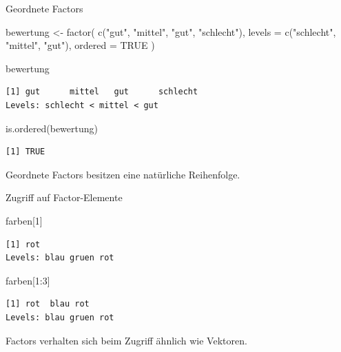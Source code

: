 \documentclass[
  10pt,
  ignorenonframetext,
  aspectratio=169,
]{beamer}
\newenvironment{Shaded}{}{}
\newcommand{\AttributeTok}[1]{\textcolor[rgb]{0.49,0.56,0.16}{#1}}
\newcommand{\ConstantTok}[1]{\textcolor[rgb]{0.53,0.00,0.00}{#1}}
\newcommand{\DecValTok}[1]{\textcolor[rgb]{0.25,0.63,0.44}{#1}}
\newcommand{\FunctionTok}[1]{\textcolor[rgb]{0.02,0.16,0.49}{#1}}
\newcommand{\NormalTok}[1]{#1}
\newcommand{\OtherTok}[1]{\textcolor[rgb]{0.00,0.44,0.13}{#1}}
\newcommand{\SpecialCharTok}[1]{\textcolor[rgb]{0.25,0.44,0.63}{#1}}
\newcommand{\StringTok}[1]{\textcolor[rgb]{0.25,0.44,0.63}{#1}}
\begin{document}
\begin{frame}[fragile]{Geordnete Factors}
\label{geordnete-factors}
\begin{Shaded}
\begin{Highlighting}[]
\NormalTok{bewertung }\OtherTok{\textless{}{-}} \FunctionTok{factor}\NormalTok{(}
  \FunctionTok{c}\NormalTok{(}\StringTok{"gut"}\NormalTok{, }\StringTok{"mittel"}\NormalTok{, }\StringTok{"gut"}\NormalTok{, }\StringTok{"schlecht"}\NormalTok{),}
  \AttributeTok{levels =} \FunctionTok{c}\NormalTok{(}\StringTok{"schlecht"}\NormalTok{, }\StringTok{"mittel"}\NormalTok{, }\StringTok{"gut"}\NormalTok{),}
  \AttributeTok{ordered =} \ConstantTok{TRUE}
\NormalTok{)}

\NormalTok{bewertung}
\end{Highlighting}
\end{Shaded}

\begin{verbatim}
[1] gut      mittel   gut      schlecht
Levels: schlecht < mittel < gut
\end{verbatim}

\begin{Shaded}
\begin{Highlighting}[]
\FunctionTok{is.ordered}\NormalTok{(bewertung)}
\end{Highlighting}
\end{Shaded}

\begin{verbatim}
[1] TRUE
\end{verbatim}

Geordnete Factors besitzen eine natürliche Reihenfolge.
\end{frame}

\begin{frame}[fragile]{Zugriff auf Factor-Elemente}
\label{zugriff-auf-factor-elemente}
\begin{Shaded}
\begin{Highlighting}[]
\NormalTok{farben[}\DecValTok{1}\NormalTok{]}
\end{Highlighting}
\end{Shaded}

\begin{verbatim}
[1] rot
Levels: blau gruen rot
\end{verbatim}

\begin{Shaded}
\begin{Highlighting}[]
\NormalTok{farben[}\DecValTok{1}\SpecialCharTok{:}\DecValTok{3}\NormalTok{]}
\end{Highlighting}
\end{Shaded}

\begin{verbatim}
[1] rot  blau rot 
Levels: blau gruen rot
\end{verbatim}

Factors verhalten sich beim Zugriff ähnlich wie Vektoren.
\end{frame}
\end{document}
